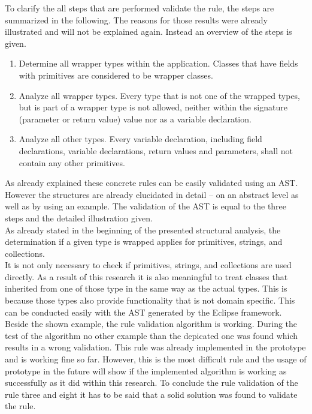 To clarify the all steps that are performed validate the rule, the steps are summarized in the following. The reasons for those results were already illustrated and will not be explained again. Instead an overview of the steps is given.
\begin{enumerate}
  \item Determine all wrapper types within the application. Classes that have fields with primitives are considered to be wrapper classes.
  \item Analyze all wrapper types. Every type that is not one of the wrapped types, but is part of a wrapper type is not allowed, neither within the signature (parameter or return value) value nor as a variable declaration.
  \item Analyze all other types. Every variable declaration, including field declarations, variable declarations, return values and parameters, shall not contain any other primitives. 
\end{enumerate}

As already explained these concrete rules can be easily validated using an \ac{AST}. However the structures are already elucidated in detail -- on an abstract level as well as by using an example. The validation of the \ac{AST} is equal to the three steps and the detailed illustration given.
\\

As already stated in the beginning of the presented structural analysis, the determination if a given type is wrapped applies for primitives, strings, and collections. 
\\

It is not only necessary to check if primitives, strings, and collections are used directly. As a result of this research it is also meaningful to treat classes that inherited from one of those type in the same way as the actual types. This is because those types also provide functionality that is not domain specific. This can be conducted easily with the \ac{AST} generated by the Eclipse framework. 
\\

Beside the shown example, the rule validation algorithm is working. During the test of the algorithm no other example than the depicated one was found which results in a wrong validation. This rule was already implemented in the prototype and is working fine so far. However, this is the most difficult rule and the usage of prototype in the future will show if the implemented algorithm is working as successfully as it did within this research. To conclude the rule validation of the rule three and eight it has to be said that a solid solution was found to validate the rule.
\\

